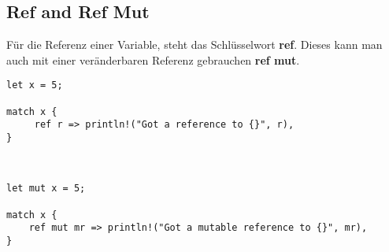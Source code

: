\subsection{Ref and Ref Mut}
Für die Referenz einer Variable, steht das Schlüsselwort \textbf{ref}. Dieses kann man auch mit einer veränderbaren Referenz gebrauchen \textbf{ref mut}.

\begin{lstlisting}
let x = 5;

match x {
     ref r => println!("Got a reference to {}", r),
}
\end{lstlisting}
\hrulefill\\
\begin{lstlisting}
let mut x = 5;

match x {
    ref mut mr => println!("Got a mutable reference to {}", mr),
}
\end{lstlisting}